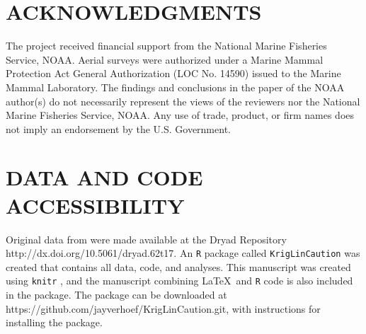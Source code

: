 \documentclass[11pt, titlepage]{article}\usepackage[]{graphicx}\usepackage[]{color}
\begin{document}
\begin{spacing}{1.9}
\begin{flushleft}
\section*{ACKNOWLEDGMENTS} 

The project received financial support from the National Marine Fisheries Service, NOAA. Aerial surveys were authorized under a Marine Mammal Protection Act General Authorization (LOC No. 14590) issued to the Marine Mammal Laboratory. The findings and conclusions in the paper of the NOAA author(s) do not necessarily represent the views of the reviewers nor the National Marine Fisheries Service, NOAA. Any use of trade, product, or firm names does not imply an endorsement by the U.S. Government. 

\section*{DATA AND CODE ACCESSIBILITY}

Original data from were made available at the Dryad Repository http://dx.doi.org/10.5061/dryad.62t17. An \texttt{R} \citep{R:Deve:Core:ALan:2017} package called \texttt{KrigLinCaution} was created that contains all data, code, and analyses. This manuscript was created using \texttt{knitr} \citep{Yihu:impl:2014,Yihu:dyna:2015,Yihu:knit:2016}, and the manuscript combining \LaTeX\ and \texttt{R} code is also included in the package.  The package can be downloaded at https://github.com/jayverhoef/KrigLinCaution.git, with instructions for installing the package.

	


%
%




\newpage






\end{flushleft}
\end{spacing}
\end{document}
